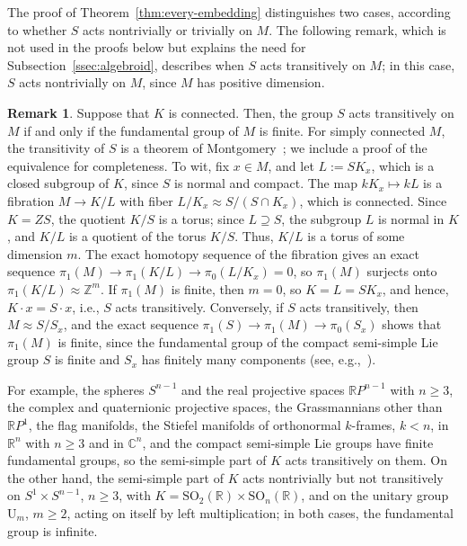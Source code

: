 \documentclass{article}
\newcommand{\R}{\mathbb{R}}
\newcommand{\C}{\mathbb{C}}
\newcommand{\Z}{\mathbb{Z}}
\theoremstyle{definition}
\newtheorem{remark}{Remark}
\theoremstyle{plain}
\begin{document}
 The proof of Theorem~\ref{thm:every-embedding} distinguishes two cases, according to whether $S$ acts nontrivially or trivially on $M$.
The following remark, which is not used in the proofs below but explains the need for Subsection~\ref{ssec:algebroid}, describes when $S$ acts transitively on $M$; in this case, $S$ acts nontrivially on $M$, since $M$ has positive dimension.

\begin{remark}\label{rem:transitive}
 Suppose that $K$ is connected.
Then, the group $S$ acts transitively on $M$ if and only if the fundamental group of $M$ is finite.
For simply connected $M$, the transitivity of $S$ is a theorem of Montgomery~\cite{Montgomery50}; we include a proof of the equivalence for completeness.
To wit, fix $x\in M$, and let $L:=SK_x$, which is a closed subgroup of $K$, since $S$ is normal and compact.
The map $kK_x\mapsto kL$ is a fibration $M\to K/L$ with fiber $L/K_x\approx S/(S\cap K_x)$, which is connected.
Since $K=ZS$, the quotient $K/S$ is a torus; since $L\supseteq S$, the subgroup $L$ is normal in $K$, and $K/L$ is a quotient of the torus $K/S$. Thus, $K/L$ is a torus of some dimension $m$.
The exact homotopy sequence of the fibration gives an exact sequence $\pi_1(M)\to\pi_1(K/L)\to\pi_0(L/K_x)=0$, so $\pi_1(M)$ surjects onto $\pi_1(K/L)\approx\Z^m$.
If $\pi_1(M)$ is finite, then $m=0$, so $K=L=SK_x$, and hence, $K\cdot x=S\cdot x$, i.e., $S$ acts transitively.
Conversely, if $S$ acts transitively, then $M\approx S/S_x$, and the exact sequence $\pi_1(S)\to\pi_1(M)\to\pi_0(S_x)$ shows that $\pi_1(M)$ is finite,
    since the fundamental group of the compact semi-simple Lie group $S$ is finite and $S_x$ has finitely many components (see, e.g.,~\cite[Chapter~V]{BtD}).
\end{remark}

For example, the spheres $S^{n-1}$ and the real projective spaces $\R P^{n-1}$ with $n\geq3$, the complex and quaternionic projective spaces, the Grassmannians other than $\R P^1$, the flag manifolds, the Stiefel manifolds of orthonormal $k$-frames, $k<n$, in $\R^n$ with $n\geq3$ and in $\C^n$, and the compact semi-simple Lie groups have finite fundamental groups, so the semi-simple part of $K$ acts transitively on them.
On the other hand, the semi-simple part of $K$ acts nontrivially but not transitively on $S^1\times S^{n-1}$, $n\geq3$, with $K=\mathrm{SO}_2(\R)\times\mathrm{SO}_n(\R)$, and on the unitary group $\mathrm{U}_m$, $m\geq2$, acting on itself by left multiplication; in both cases, the fundamental group is infinite.
\end{document}
